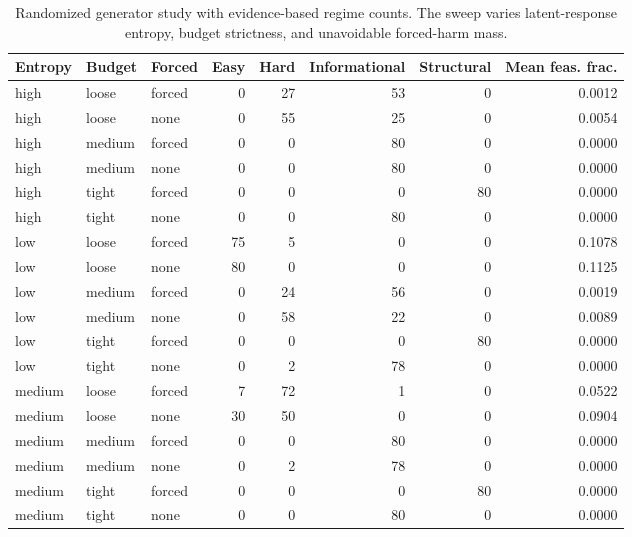 \begin{table}[t]
\centering
\scriptsize
\caption{Randomized generator study with evidence-based regime counts. The sweep varies latent-response entropy, budget strictness, and unavoidable forced-harm mass.}
\label{tab:random_generator_study_v2}
\begin{tabular}{lllrrrrr}
\toprule
Entropy & Budget & Forced & Easy & Hard & Informational & Structural & Mean feas. frac. \\
\midrule
high & loose & forced & 0 & 27 & 53 & 0 & 0.0012 \\
high & loose & none & 0 & 55 & 25 & 0 & 0.0054 \\
high & medium & forced & 0 & 0 & 80 & 0 & 0.0000 \\
high & medium & none & 0 & 0 & 80 & 0 & 0.0000 \\
high & tight & forced & 0 & 0 & 0 & 80 & 0.0000 \\
high & tight & none & 0 & 0 & 80 & 0 & 0.0000 \\
low & loose & forced & 75 & 5 & 0 & 0 & 0.1078 \\
low & loose & none & 80 & 0 & 0 & 0 & 0.1125 \\
low & medium & forced & 0 & 24 & 56 & 0 & 0.0019 \\
low & medium & none & 0 & 58 & 22 & 0 & 0.0089 \\
low & tight & forced & 0 & 0 & 0 & 80 & 0.0000 \\
low & tight & none & 0 & 2 & 78 & 0 & 0.0000 \\
medium & loose & forced & 7 & 72 & 1 & 0 & 0.0522 \\
medium & loose & none & 30 & 50 & 0 & 0 & 0.0904 \\
medium & medium & forced & 0 & 0 & 80 & 0 & 0.0000 \\
medium & medium & none & 0 & 2 & 78 & 0 & 0.0000 \\
medium & tight & forced & 0 & 0 & 0 & 80 & 0.0000 \\
medium & tight & none & 0 & 0 & 80 & 0 & 0.0000 \\
\bottomrule
\end{tabular}
\end{table}
